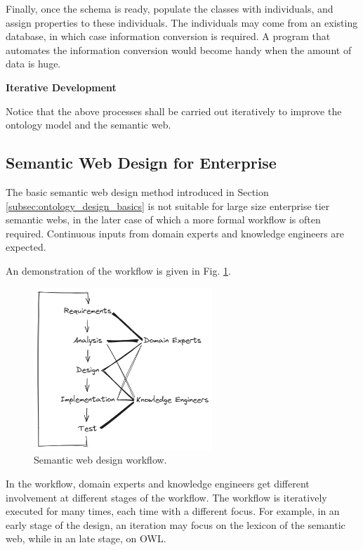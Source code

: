 Finally, once the schema is ready, populate the classes with individuals, and assign properties to these individuals. The individuals may come from an existing database, in which case information conversion is required. A program that automates the information conversion would become handy when the amount of data is huge.

\vspace{0.1in}
\noindent \textbf{Iterative Development}
\vspace{0.1in}

Notice that the above processes shall be carried out iteratively to improve the ontology model and the semantic web. 

\subsection{Semantic Web Design for Enterprise}

The basic semantic web design method introduced in Section \ref{subsec:ontology_design_basics} is not suitable for large size enterprise tier semantic webs, in the later case of which a more formal workflow is often required. Continuous inputs from domain experts and knowledge engineers are expected.

An demonstration of the workflow is given in Fig. \ref{fig:swdesignwf}.
\begin{figure}[htbp]
	\centering
	\includegraphics[width=0.6\textwidth]{chapters/part-4/figures/semantic_web_design_workflow.png}
	\caption{Semantic web design workflow.}
	\label{fig:swdesignwf}
\end{figure}
In the workflow, domain experts and knowledge engineers get different involvement at different stages of the workflow. The workflow is iteratively executed for many times, each time with a different focus. For example, in an early stage of the design, an iteration may focus on the lexicon of the semantic web, while in an late stage, on OWL.

